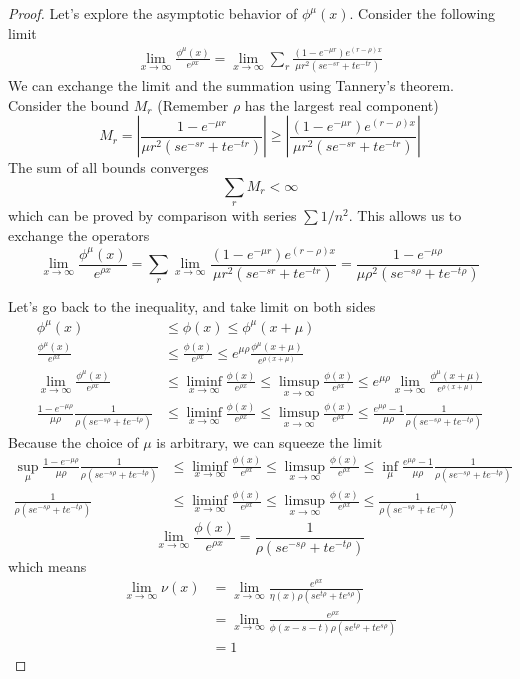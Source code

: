 \documentclass[]{article}
\begin{document}
\begin{proof}
Let's explore the asymptotic behavior of $\phi^{\mu}(x)$. Consider the following limit
\begin{align*}
\lim_{x\to\infty}\frac{\phi^{\mu}(x)}{e^{\rho x}} = \lim_{x\to\infty}\sum_{r} \frac{(1-e^{-\mu r})e^{(r-\rho)x}}{\mu r^2(se^{-sr}+te^{-tr})}
\end{align*}
We can exchange the limit and the summation using Tannery's theorem. Consider the bound $M_r$ (Remember $\rho$ has the largest real component)
\[
M_r =\left| \frac{1-e^{-\mu r}}{\mu r^2(se^{-sr}+te^{-tr})} \right| \ge \left| \frac{(1-e^{-\mu r})e^{(r-\rho)x}}{\mu r^2(se^{-sr}+te^{-tr})} \right|
\]
The sum of all bounds converges
\[
\sum_{r} M_r < \infty
\]
which can be proved by comparison with series $\sum 1/n^2$. This allows us to exchange the operators
\[
\lim_{x\to\infty}\frac{\phi^{\mu}(x)}{e^{\rho x}} =\sum_{r}  \lim_{x\to\infty}\frac{(1-e^{-\mu r})e^{(r-\rho)x}}{\mu r^2(se^{-sr}+te^{-tr})} = \frac{1-e^{-\mu \rho}}{\mu \rho^2(se^{-s\rho}+te^{-t\rho})}
\]

Let's go back to the inequality, and take limit on both sides
\begin{align*}
\phi^{\mu}(x)&\le\phi(x)\le\phi^{\mu}(x+\mu) \\
\frac{\phi^{\mu}(x)}{e^{\rho x}}&\le\frac{\phi(x)}{e^{\rho x}}\le e^{\mu\rho} \frac{\phi^{\mu}(x+\mu)}{e^{\rho (x+\mu)}} \\
\lim_{x\to\infty}\frac{\phi^{\mu}(x)}{e^{\rho x}} &\le \liminf_{x\to\infty}\frac{\phi(x)}{e^{\rho x}} \le \limsup_{x\to\infty}\frac{\phi(x)}{e^{\rho x}}\le e^{\mu\rho} \lim_{x\to\infty}\frac{\phi^{\mu}(x+\mu)}{e^{\rho (x+\mu)}} \\
 \frac{1-e^{-\mu \rho}}{\mu \rho}\frac{1}{\rho(se^{-s\rho}+te^{-t\rho})} &\le \liminf_{x\to\infty}\frac{\phi(x)}{e^{\rho x}} \le \limsup_{x\to\infty}\frac{\phi(x)}{e^{\rho x}}\le  \frac{e^{\mu \rho}-1}{\mu \rho}\frac{1}{\rho(se^{-s\rho}+te^{-t\rho})}
\end{align*}
Because the choice of $\mu$ is arbitrary, we can squeeze the limit
\begin{align*}
 \sup_{\mu}\frac{1-e^{-\mu \rho}}{\mu \rho}\frac{1}{\rho(se^{-s\rho}+te^{-t\rho})} &\le \liminf_{x\to\infty}\frac{\phi(x)}{e^{\rho x}} \le \limsup_{x\to\infty}\frac{\phi(x)}{e^{\rho x}}\le \inf_{\mu}\frac{e^{\mu \rho}-1}{\mu \rho}\frac{1}{\rho(se^{-s\rho}+te^{-t\rho})}\\
\frac{1}{\rho(se^{-s\rho}+te^{-t\rho})} &\le \liminf_{x\to\infty}\frac{\phi(x)}{e^{\rho x}} \le \limsup_{x\to\infty}\frac{\phi(x)}{e^{\rho x}}\le \frac{1}{\rho(se^{-s\rho}+te^{-t\rho})}
\end{align*}
\[
\lim_{x\to\infty} \frac{\phi(x)}{e^{\rho x}} = \frac{1}{\rho(se^{-s\rho}+te^{-t\rho})}
\]
which means
\begin{align*}
\lim_{x\to\infty} \nu(x) &= \lim_{x\to\infty}  \frac{e^{\rho x}}{\eta(x)\rho(se^{t\rho} + te^{s\rho})} \\
&= \lim_{x\to\infty}  \frac{e^{\rho x}}{\phi(x-s-t)\rho(se^{t\rho} + te^{s\rho})} \\
&= 1
\end{align*}
\end{proof}
\end{document}
